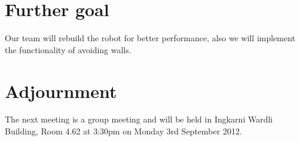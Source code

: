 \documentclass[11pt, a4paper]{article}
\begin{document}
\section{Further goal}
Our team will rebuild the robot for better performance, also we will implement the functionality of avoiding walls.

\section{Adjournment}
The next meeting is a group meeting and will be held in Ingkarni Wardli Building, Room 4.62 at 3:30pm on Monday 3rd September 2012.

\vspace*{10pt}
\end{document}
